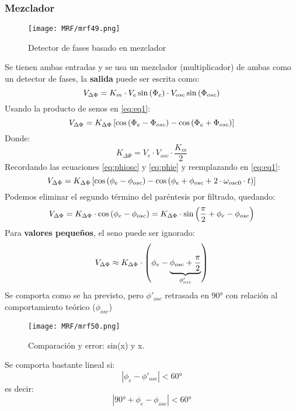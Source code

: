 \documentclass[
	12pt, %
	fleqn, %
	a4paper, %
	oneside, %
]{LegrandOrangeBook}
\begin{document}
\subsubsection{Mezclador}
\begin{figure}[H]
\centering
\texttt{[image: MRF/mrf49.png]}
\caption{Detector de fases basado en mezclador}
\end{figure}
Se tienen ambas entradas y se usa un mezclador (multiplicador) de ambas como un detector de fases, la \textbf{salida} puede ser escrita como:
\begin{equation}
V_{\Delta\Phi}=K_m\cdot V_e\sin\left(\Phi_e\right)\cdot V_{osc}\sin\left(\Phi_{osc}\right)
\label{eq:eq1}
\end{equation}
Usando la producto de senos en \ref{eq:eq1}:
\begin{equation}
V_{\Delta\Phi}=K_{\Delta\Phi}\left[\cos\left(\Phi_e-\Phi_{osc}\right)-\cos\left(\Phi_e+\Phi_{osc}\right)\right]
\label{eq:eq2}
\end{equation}
Donde:
\begin{displaymath}
K_{\Delta\Phi}=V_e\cdot V_{osc}\cdot \frac{K_m}{2}
\end{displaymath}
Recordando las ecuaciones \ref{eq:phiosc} y \ref{eq:phie} y reemplazando en \ref{eq:eq1}:
\begin{equation}
V_{\Delta\Phi}=K_{\Delta\Phi}\left[\cos\left(\phi_e-\phi_{osc}\right)-\cos\left(\phi_e+\phi_{osc}+2\cdot\omega_{osc0}\cdot t\right)\right]
\end{equation}
Podemos eliminar el segundo término del paréntesis por filtrado, quedando:
\begin{equation}
V_{\Delta\Phi}=K_{\Delta\Phi}\cdot\cos\left(\phi_e-\phi_{osc}\right)=K_{\Delta\Phi}\cdot\sin\left(\frac{\pi}{2}+\phi_e-\phi_{osc}\right)
\end{equation}
Para \textbf{valores pequeños}, el seno puede ser ignorado:
\begin{equation}
V_{\Delta\Phi}\approx K_{\Delta\Phi}\cdot\left(\phi_e-\underbrace{\phi_{osc}+\frac{\pi}{2}}_{\phi'_{osc}}\right)
\end{equation}
Se comporta como se ha previsto, pero $\phi'_{osc}$ retrasada en 90° con relación al comportamiento teórico ($\phi_{osc}$)
\begin{figure}[H]
\centering
\texttt{[image: MRF/mrf50.png]}
\caption{Comparación y error: sin(x) y x.}
\end{figure}
\begin{corollary}
Se comporta bastante lineal si:
\begin{displaymath}
|\phi_e-\phi'_{osc}|<60°
\end{displaymath}
es decir:
\begin{displaymath}
|90°+\phi_e-\phi_{osc}|<60°
\end{displaymath}
\end{corollary}
\end{document}
